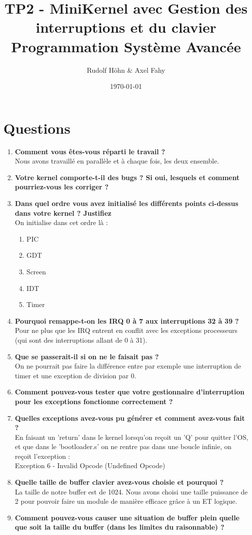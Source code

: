 \documentclass[a4paper]{article}
\title{TP2 - MiniKernel avec Gestion des interruptions et du clavier\\Programmation Système Avancée}
\author{Rudolf Höhn \& Axel Fahy}
\date{\today}
\begin{document}
\maketitle

\section{Questions}
\begin{enumerate}
\item \textbf{Comment vous êtes-vous réparti le travail ?}\\
Nous avons travaillé en parallèle et à chaque fois, les deux ensemble. 
\item \textbf{Votre kernel comporte-t-il des bugs ? Si oui, lesquels et comment pourriez-vous les corriger ?}\\
\item \textbf{Dans quel ordre vous avez initialisé les différents points ci-dessus dans votre kernel ? Justifiez}\\
On initialise dans cet ordre là :
\begin{enumerate}
\item PIC
\item GDT
\item Screen
\item IDT
\item Timer
\end{enumerate}

\item \textbf{Pourquoi remappe-t-on les IRQ 0 à 7 aux interruptions 32 à 39 ?}\\
Pour ne plus que les IRQ entrent en conflit avec les exceptions processeurs (qui sont des interruptions allant de 0 à 31).
\item \textbf{Que se passerait-il si on ne le faisait pas ?}\\
On ne pourrait pas faire la différence entre par exemple une interruption de timer et une exception de division par 0.
\item \textbf{Comment pouvez-vous tester que votre gestionnaire d'interruption pour les exceptions fonctionne correctement ?}
\item \textbf{Quelles exceptions avez-vous pu générer et comment avez-vous fait ?}\\
En faisant un 'return' dans le kernel lorsqu'on reçoit un 'Q' pour quitter l'OS, et que dans le 'bootloader.s' on ne rentre pas dans une boucle infinie, on reçoit l'exception : \\
Exception 6 - Invalid Opcode (Undefined Opcode)
\item \textbf{Quelle taille de buffer clavier avez-vous choisie et pourquoi ?}\\
La taille de notre buffer est de 1024. Nous avons choisi une taille puissance de 2 pour pouvoir faire un module de manière efficace grâce à un ET logique.
\item \textbf{Comment pouvez-vous causer une situation de buffer plein quelle que soit la taille du buffer (dans les limites du raisonnable) ?}
\end{enumerate}
\end{document}
